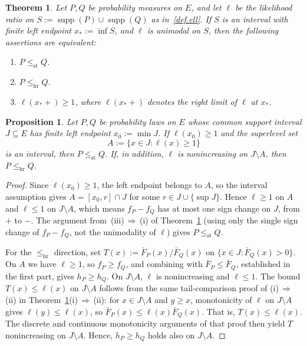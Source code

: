 \documentclass[10pt,a4paper]{amsart}
\newtheorem{thm}{Theorem}
\newtheorem{prop}{Proposition}
\newcommand{\hr}{\le_{\mathrm{hr}}}
\newcommand{\st}{\le_{\mathrm{st}}}
\DeclareMathOperator{\supp}{supp}
\begin{document}
\begin{thm}
\label{thm:unimodal-criterion}
Let \(P,Q\) be probability measures on \(E\), and let \(\ell\) be the likelihood ratio on $S:=\supp(P)\cup\supp(Q)$ as in~\eqref{def.ell}. If \(S\) is an interval with finite left endpoint \(x_*:=\inf S\), and \(\ell\) is unimodal on \(S\), then the following assertions are equivalent:
\begin{enumerate}[label=\textup{(\roman*)}]
\item $P\st Q$.
\item $P\hr Q$.
\item $\ell(x_*+)\ge 1$, where $\ell(x_*+)$ denotes the right limit of \(\ell\) at $x_*$.
\end{enumerate}
\end{thm}

\begin{prop}
\label{prop:ylp-one-sided-score}
Let $P,Q$ be probability laws on $E$ whose common support interval $J\subseteq E$ has finite left endpoint $x_0:=\min J$. If $\ell(x_0)\ge 1$ and the superlevel set
\[
A:=\{x\in J:\ell(x)\ge 1\}
\]
is an interval, then $P\st Q$. If, in addition, $\ell$ is nonincreasing on $J\setminus A$, then $P\hr Q$.
\end{prop}

\begin{proof}
Since $\ell(x_0)\ge 1$, the left endpoint belongs to $A$, so the interval assumption gives $A=[x_0,r]\cap J$ for some $r\in J\cup\{\sup J\}$. Hence $\ell\ge 1$ on $A$ and $\ell\le 1$ on $J\setminus A$, which means $f_P-f_Q$ has at most one sign change on $J$, from $+$ to $-$. The argument from~\textup{(iii)}\,$\Rightarrow$\,\textup{(i)} of Theorem~\ref{thm:unimodal-criterion} (using only the single sign change of $f_P-f_Q$, not the unimodality of $\ell$) gives $P\st Q$.

For the $\hr$ direction, set $T(x):=\bar F_P(x)/\bar F_Q(x)$ on $\{x\in J:\bar F_Q(x)>0\}$. On $A$ we have $\ell\ge 1$, so $f_P\ge f_Q$, and combining with $\bar F_P\le \bar F_Q$, established in the first part, gives $h_P\ge h_Q$. On $J\setminus A$, $\ell$ is nonincreasing and $\ell\le 1$. The bound $T(x)\le \ell(x)$ on $J\setminus A$ follows from the same tail-comparison proof of \textup{(i)}\,$\Rightarrow$\,\textup{(ii)} in Theorem~\ref{thm:unimodal-criterion}\textup{(i)}\,$\Rightarrow$\,\textup{(ii)}: for $x\in J\setminus A$ and $y\ge x$, monotonicity of $\ell$ on $J\setminus A$ gives $\ell(y)\le\ell(x)$, so $\bar F_P(x)\le \ell(x)\bar F_Q(x)$. That is, $T(x)\le \ell(x)$. The discrete and continuous monotonicity arguments of that proof then yield $T$ nonincreasing on $J\setminus A$. Hence, $h_P\ge h_Q$ holds also on $J\setminus A$.
\end{proof}
\end{document}

